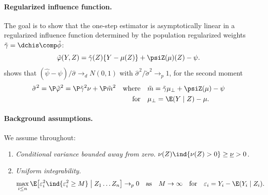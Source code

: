 \documentclass{article}
\begin{document}
\paragraph{Regularized influence function.}
The goal is to show that the one-step estimator
is asymptotically linear in a regularized influence function
determined by the population regularized weights
$\tilde\gamma = \dchis \comp \tilde\phi$:
\begin{equation}\label{eq:regularized-influence}
\tilde\varphi(Y, Z)
  = \tilde\gamma(Z)\{Y - \mu(Z)\}
  + \psiZ(\mu)(Z) - \psi.
\end{equation}
 shows that
$(\hat\psi - \psi)/\hat\sigma \to_d N(0,1)$
with $\hat\sigma^2 / \tilde\sigma^2 \to_p 1$,
for the second moment
\begin{equation}\label{eq:tilde-sigma}
\begin{aligned}
\tilde\sigma^2 = \P\tilde\varphi^2 = \P\tilde\gamma^2\nu + \P\tilde m^2
\qqtext{where} &\tilde m  = \tilde\gamma \mu_\perp + \psiZ(\mu) - \psi \\
\qfor          &\mu_\perp = \E(Y \mid Z) - \mu.
\end{aligned}
\end{equation}

\paragraph{Background assumptions.}
We assume throughout:
\begin{enumerate}
\item[\textup{(i)}]
\textit{Conditional variance bounded away from zero.}
$\nu(Z)\ind{\nu(Z) > 0} \ge \underline{\nu} > 0$.
\item[\textup{(ii)}]
\textit{Uniform integrability.}
\begin{equation}\label{eq:uniform-integrability}
\max_{i \le n}
\E\qty[\varepsilon_i^2
  \ind{\varepsilon_i^2 \ge M}
  \;\big|\; Z_1 \ldots Z_n]
\to_p 0
\qqtext{as} M \to \infty
\qqtext{for} \varepsilon_i = Y_i - \E(Y_i \mid Z_i).
\end{equation}
\end{enumerate}
\end{document}
